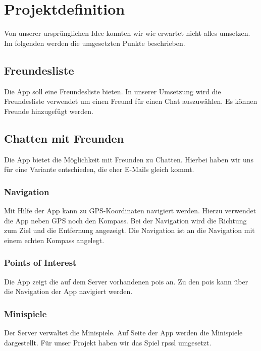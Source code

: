 \chapter{Projektdefinition}
Von unserer ursprünglichen Idee konnten wir wie erwartet nicht alles umsetzen. Im folgenden werden die umgesetzten Punkte beschrieben.


\section{Freundesliste}
Die App soll eine Freundesliste bieten. In unserer Umsetzung wird die Freundesliste verwendet um einen Freund für einen Chat auszuwählen. Es können Freunde hinzugefügt werden.

\section{Chatten mit Freunden}
Die App bietet die Möglichkeit mit Freunden zu Chatten. Hierbei haben wir uns für eine Variante entschieden, die eher E-Mails gleich kommt.

\subsection{Navigation}
Mit Hilfe der App kann zu GPS-Koordinaten navigiert werden. Hierzu verwendet die App neben GPS noch den Kompass. Bei der Navigation wird die Richtung zum Ziel und die Entfernung angezeigt. Die Navigation ist an die Navigation mit einem echten Kompass angelegt.

\subsection{Points of Interest}
Die App zeigt die auf dem Server vorhandenen \glspl{poi} an. Zu den \glspl{poi} kann über die Navigation der App navigiert werden.

\subsection{Minispiele}
Der Server verwaltet die Minispiele. Auf Seite der App werden die Minispiele dargestellt. Für unser Projekt haben wir das Spiel \gls{rpssl} umgesetzt.